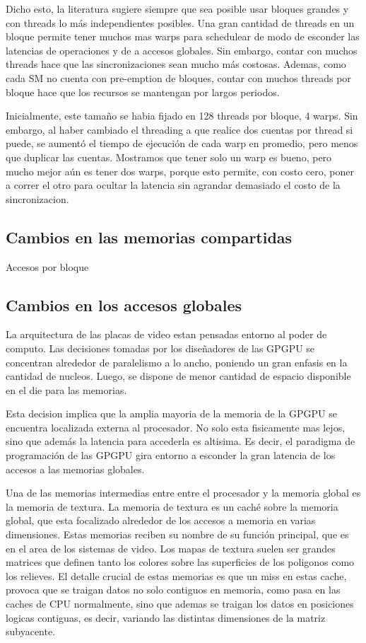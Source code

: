 Dicho esto, la literatura \cite{NVIDIA_OPTIMIZATIONS} sugiere siempre que sea posible
usar bloques grandes y con threads lo m\'as independientes posibles. Una gran cantidad de threads
en un bloque permite tener muchos mas warps para schedulear de modo de esconder las latencias de
operaciones y de a accesos globales. Sin embargo, contar con muchos threads hace que las
sincronizaciones sean mucho m\'as costosas. Ademas, como cada SM no cuenta con pre-emption
de bloques, contar con muchos threads por bloque hace que los recursos se mantengan
por largos periodos.

Inicialmente, este tama\~no se habia fijado en 128 threads por bloque, 4 warps. Sin embargo,
al haber cambiado el threading a que realice dos cuentas por thread si puede, se aument\'o
el tiempo de ejecuci\'on de cada warp en promedio, pero menos que duplicar las cuentas.
Mostramos que tener solo un warp es bueno, pero mucho mejor a\'un es tener dos warps, porque
esto permite, con costo cero, poner a correr el otro para ocultar la latencia sin agrandar
demasiado el costo de la sincronizacion.


\subsection{Cambios en las memorias compartidas}
Accesos por bloque

\subsection{Cambios en los accesos globales}
La arquitectura de las placas de video estan pensadas entorno al poder de computo.
Las decisiones tomadas por los diseñadores de las GPGPU se concentran alrededor
de paralelismo a lo ancho, poniendo un gran enfasis en la cantidad de nucleos. Luego,
se dispone de menor cantidad de espacio disponible en el die para las memorias.

Esta decision implica que la amplia mayoria de la memoria de la GPGPU se encuentra
localizada externa al procesador.  No solo esta fisicamente mas lejos, sino que
adem\'as la latencia para accederla es altisima. Es decir, el paradigma de
programaci\'on de las GPGPU gira entorno a esconder la gran latencia de los accesos
a las memorias globales.

Una de las memorias intermedias entre entre el procesador y la memoria global es
la memoria de textura. La memoria de textura es un cach\'e sobre la memoria global,
que esta focalizado alrededor de los accesos a memoria en varias dimensiones.
Estas memorias reciben su nombre de su funci\'on principal, que es en el area de los
sistemas de video. Los mapas de textura suelen ser grandes matrices que definen
tanto los colores sobre las superficies de los poligonos como los relieves.
El detalle crucial de estas memorias es que un miss en estas cache, provoca
que se traigan datos no solo contiguos en memoria, como pasa en las caches de
CPU normalmente, sino que ademas se traigan los datos en posiciones logicas contiguas,
es decir, variando las distintas dimensiones de la matriz subyacente.

